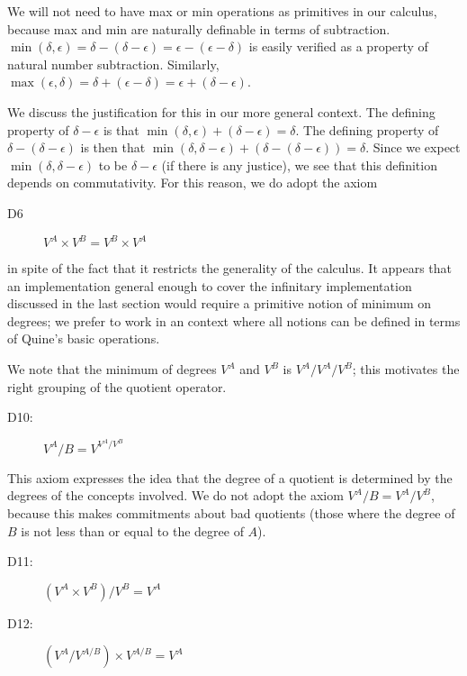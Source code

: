 \documentclass{article}
\begin{document}
We will not need to have max or min operations as primitives in our
calculus, because max and min are naturally definable in terms of
subtraction.  $\min(\delta,\epsilon) = \delta - (\delta - \epsilon) =
\epsilon - (\epsilon - \delta)$ is easily verified as a property of
natural number subtraction.  Similarly, $\max(\epsilon,\delta) =
\delta + (\epsilon - \delta) = \epsilon + (\delta - \epsilon)$.

We discuss the justification for this in our more general context.
The defining property of $\delta - \epsilon$ is that
$\min(\delta,\epsilon) + (\delta - \epsilon) = \delta$.  The defining
property of $\delta - (\delta - \epsilon)$ is then that
$\min(\delta,\delta - \epsilon) + (\delta - (\delta - \epsilon)) =
\delta$.  Since we expect $\min(\delta,\delta - \epsilon)$ to be
$\delta - \epsilon$ (if there is any justice), we see that this
definition depends on commutativity.  For this reason, we do adopt the
axiom

\begin{description}

\item[D6] $V^A \times V^B = V^B \times V^A$

\end{description}

in spite of the fact that it restricts the generality of the calculus.
It appears that an implementation general enough to cover the
infinitary implementation discussed in the last section would require
a primitive notion of minimum on degrees; we prefer to work in an
context where all notions can be defined in terms of Quine's basic
operations.

We note that the minimum of degrees $V^A$ and $V^B$ is $V^A/V^A/V^B$;
this motivates the right grouping of the quotient operator.

\begin{description}

\item[D10:] $V^A/B = V^{V^A/V^B}$

\end{description}

This axiom expresses the idea that the degree of a quotient is
determined by the degrees of the concepts involved.  We do not adopt
the axiom $V^A/B=V^A/V^B$, because this makes commitments about bad
quotients (those where the degree of $B$ is not less than or equal to
the degree of $A$).

\begin{description}

\item[D11:] $(V^A \times V^B)/V^B = V^A$

\item[D12:]  $(V^A/V^{A/B}) \times V^{A/B} = V^A$

\end{description}
\end{document}
